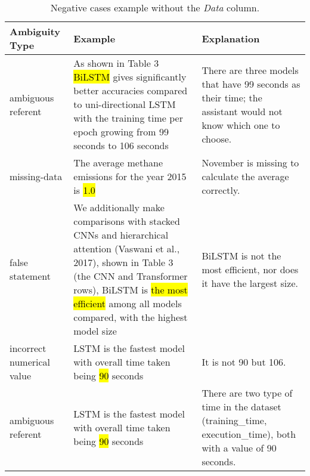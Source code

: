\begin{table}[t]
    \centering
    \small
    \begin{tabular}{p{3cm} p{6cm} p{4cm}}
        \hline
        \textbf{Ambiguity Type} & \textbf{Example} & \textbf{Explanation} \\
        \hline

        ambiguous referent &
        As shown in Table 3 \hl{BiLSTM} gives significantly better accuracies compared to uni-directional LSTM with the training time per epoch growing from 99 seconds to 106 seconds &
        There are three models that have 99 seconds as their time; the assistant would not know which one to choose. \\

        missing-data &
        The average methane emissions for the year 2015 is \hl{1.0} &
        November is missing to calculate the average correctly. \\

        false statement &
        We additionally make comparisons with stacked CNNs and hierarchical attention (Vaswani et al., 2017), shown in Table 3 (the CNN and Transformer rows), BiLSTM is \hl{the most efficient} among all models compared, with the highest model size &
        BiLSTM is not the most efficient, nor does it have the largest size. \\

        incorrect numerical value &
        LSTM is the fastest model with overall time taken being \hl{90} seconds &
        It is not 90 but 106. \\

        ambiguous referent &
        LSTM is the fastest model with overall time taken being \hl{90} seconds &
        There are two type of time in the dataset (training\_time, execution\_time), both with a value of 90 seconds. \\

        \hline
    \end{tabular}
    \caption{Negative cases example without the \emph{Data} column.}
    \label{tab:ambiguita}
\end{table}





